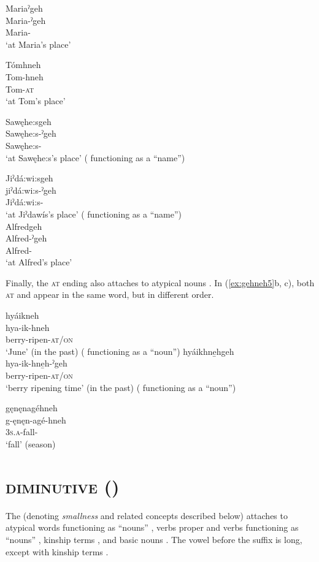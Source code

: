 \ex Mariaˀgeh \\
\gll Maria-ˀgeh\\
Maria-\textsc{\on}\\
\glt ‘at Maria’s place’

\ex Tómhneh\\
\gll Tom-hneh\\
Tom-\textsc{at}\\
\glt ‘at Tom’s place’

\ex Sawęhe:sgeh \\
\gll Sawęhe:s-ˀgeh\\
 Sawęhe:s-\textsc{\on}\\
 \glt  ‘at Sawęhe:s’s place’ ( functioning as a “name”)

\ex Jiˀdá:wi:sgeh\\
\gll jiˀdá:wi:s-ˀgeh\\
  Jiˀdá:wi:s-\textsc{\on}\\
\glt ‘at Jiˀdawís’s place’ ( functioning as a “name”)\\


\ex Alfredgeh\\
\gll Alfred-ˀgeh\\
Alfred-\textsc{\on}\\
\glt ‘at Alfred’s place’
\z
\z


Finally, the  \textsc{at} ending also attaches to atypical nouns . In (\ref{ex:gehneh5}b, c), both  \textsc{at} and  {\on} appear in the same word, but in different order.

\ea\label{ex:gehneh5}
\ea hyáikneh \\\label{ex:gehneh5a}
\gll hya-ik-hneh\\
berry-ripen-\textsc{at/on}\\
\glt ‘June’ (in the past) ( functioning as a “noun”) 
\ex hyáikhne̱hgeh \\\label{ex:gehneh5b}
\gll hya-ik-hne̱h-ˀgeh\\
berry-ripen-\textsc{at/on}\\
\glt ‘berry ripening time’ (in the past) ( functioning as a “noun”)

\ex gęnęnagéhneh \\\label{ex:gehneh5c}
\gll g-ęnęn-agé-hneh\\
\textsc{3s.a}-fall-\\
\glt ‘fall’ (season) 
\z
\z

\section{ \textsc{diminutive} \textup{(}{\diminutive}\textup{)}} \label{-:ˀah}
The   {\diminutive} (denoting \textit{smallness} and related concepts described below) attaches to atypical words functioning as “nouns” , verbs proper and verbs functioning as “nouns” , kinship terms , and basic nouns . The vowel before the suffix is long, except with kinship terms .

